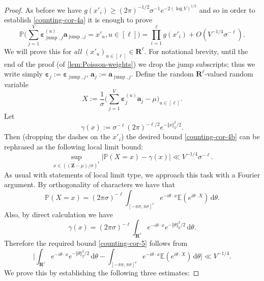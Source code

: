 \documentclass[11pt,reqno]{amsart}
\numberwithin{equation}{section}
\theoremstyle{definition}
\theoremstyle{remark}
\newcommand{\mb}{\mathbb}
\newcommand{\mbf}{\mathbf}
\newcommand{\eps}{\varepsilon}
\def\boldeps{\boldsymbol\eps}
\renewcommand{\ge}{\geqslant}
\newcommand\jump{\operatorname{jump}}
\begin{document}
\begin{proof}
As before we have $g(x'_i) \ge (2\pi)^{-1/2}\sigma^{-1} e^{-2(\log V)^{1/2}}$ and so in order to establish \cref{counting-cor-4a} it is enough to prove
\begin{equation}\label{counting-cor-4b}
\mb{P}\Big( \sum_{j = 1}^V \boldeps_{\jump,j}^{(u)} \mbf{a}_{\jump,j} = x'_u, u \in [\ell]  \Big) =   \prod_{i=1}^{\ell} g(x'_i) + O(V^{-1/4} \sigma^{-\ell}).
\end{equation}
We will prove this for \emph{all} $(x'_u)_{u \in [\ell]} \in \mbf{R}^{\ell}$. For notational brevity, until the end of the proof (of \cref{lem:Poisson-weights}) we drop the jump subscripts; thus we write simply $\boldeps_j := \boldeps_{\jump, j}$, $\mbf{a}_{j} := \mbf{a}_{\jump, j}$. Define the random $\mbf{R}^{\ell}$-valued random variable
\begin{equation}\label{x-rv-def} X := \frac{1}{\sigma}\big( \sum_{j = 1}^V \boldeps_{j}^{(u)} \mbf{a}_{j} - \mu\big)_{u \in [\ell]}.\end{equation}  Let 
\[ \gamma(x) :=  \sigma^{-\ell} (2\pi)^{-\ell/2} e^{-\Vert x \Vert_2^2/2}.\] Then (dropping the dashes on the $x'_i$) the desired bound \cref{counting-cor-4b} can be rephrased as the following local limit bound:
\begin{equation}\label{counting-cor-5} \sup_{x \in ((\mbf{Z} - \mu)/\sigma)^{\ell}}\big| \mb{P}(X = x) - \gamma(x) \big| \ll V^{-1/4} \sigma^{-\ell}.\end{equation} As usual with statements of local limit type, we approach this task with a Fourier argument.
By orthogonality of characters we have that 
\begin{equation*} \mb{P}(X = x) =  (2\pi \sigma)^{-\ell}\int_{[-\pi\sigma,\pi \sigma]^{\ell}}e^{-i\theta \cdot x}\mb{E} (e^{i\theta \cdot X})\, \mathrm{d}\theta.\end{equation*}
Also, by direct calculation we have 
\begin{equation*} \gamma(x)  = (2\pi \sigma)^{-\ell}\int_{\mathbf{R}^{\ell}} e^{-i \theta \cdot x} e^{-\Vert \theta\Vert_2^2/2} \, \mathrm{d}\theta.
\end{equation*}
Therefore the required bound \cref{counting-cor-5} follows from 
\begin{equation}\label{counting-cor-6} \Big| \int_{\mathbf{R}^{\ell}} e^{-i \theta \cdot x} e^{-\Vert \theta\Vert_2^2/2} \, \mathrm{d}\theta  - \int_{[-\pi\sigma,\pi \sigma]^{\ell}}e^{-i\theta \cdot x}\mb{E} (e^{i\theta \cdot X})\, \mathrm{d}\theta \Big| \ll V^{-1/4}.\end{equation}
We prove this by establishing the following three estimates:

\end{proof}
\end{document}
